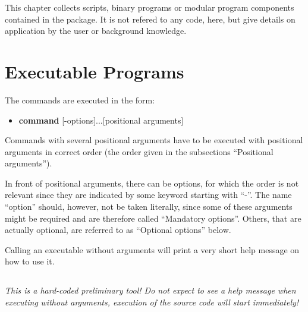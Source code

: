 
%
%
%
This chapter collects scripts, binary programs or modular program components contained 
in the \ASKI{} package. It is not refered to any code, here, but give details on application
by the user or background knowledge.
%
\section{Executable Programs} \label{programs_scripts,sec:bin_prog}
%
The commands are executed in the form:
\begin{itemize}
\item[]{\bf command} [-options]...[positional arguments]
\end{itemize}
Commands with several positional arguments have to be executed with positional arguments in correct 
order (the order given in the subsections ``Positional arguments'').

In front of positional arguments, there can be options, for which the order is not relevant
since they are indicated by some keyword starting with ``-''. The name ``option'' should, however,
not be taken literally, since some of these arguments might be required and are therefore
called ``Mandatory options''. Others, that are actually optional, are referred to as ``Optional options''
below.

Calling an executable without arguments will print a very short help message on how to use it.
%
%
\subsection{} \label{programs_scripts,sec:bin_prog,sec:addSpikeCheckerToKim}
\emph{This is a hard-coded preliminary tool! Do not expect to see a help message when executing} 
 \emph{without arguments, execution of the source code will start 
immediately!}

